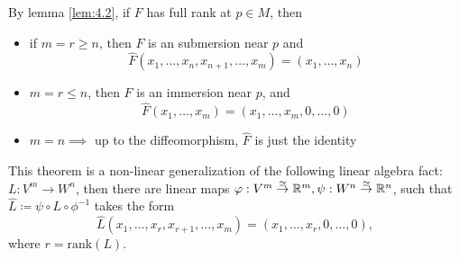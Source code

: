 \begin{remark}
    By lemma \ref{lem:4.2}, if \(F\) has full rank at \(p\in M\), then 
    \begin{itemize}
        \item  if \(m=r\geq n\), then \(F\) is an submersion near \(p\) and \[\hat{F}(x_1,\dots,x_n,x_{n+1},\dots,x_m)=(x_1,\dots,x_n)\]
        \item \(m=r\leq n\), then \(F\) is an immersion near \(p\), and \[\hat{F}(x_1,\dots,x_m)=(x_1,\dots,x_m,0,\dots,0)\]
        \item \(m=n\implies\) up to the diffeomorphism, \(\hat{F}\) is just the identity
    \end{itemize}
    
\end{remark}

\begin{remark}
    This theorem is a non-linear 
    generalization of the following linear algebra fact: \(L:V^m\to W^n\), then 
    there are linear maps \(\varphi:V^m\stackrel{\simeq}{\to}\mathbb{R}^m,\psi:W^n\stackrel{\simeq}{\to}\mathbb{R}^n\),
    such that \(\hat{L}\coloneqq \psi\circ L\circ \phi^{-1}\) takes the form 
    \[\hat{L}(x_1,\dots,x_r,x_{r+1},\dots,x_m)=(x_1,\dots,x_r,0,\dots,0),\]
    where \(r=\text{rank}(L)\).
\end{remark}

